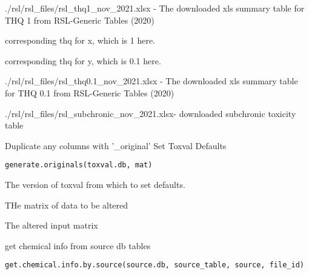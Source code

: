 \documentclass[letterpaper]{book}
\begin{document}
\begin{Arguments}
\begin{ldescription}
\item[\code{x}] ./rsl/rsl\_files/rsl\_thq1\_nov\_2021.xlsx - The downloaded xls summary table for THQ 1 from RSL-Generic Tables (2020)

\item[\code{thq\_x}] corresponding thq for x, which is 1 here.

\item[\code{thq\_y}] corresponding thq for y, which is 0.1 here.

\item[\code{Y}] ./rsl/rsl\_files/rsl\_thq0.1\_nov\_2021.xlsx - The downloaded xls summary table for THQ 0.1 from RSL-Generic Tables (2020)

\item[\code{Z}] ./rsl/rsl\_files/rsl\_subchronic\_nov\_2021.xlsx- downloaded subchronic toxicity table
\end{ldescription}
\end{Arguments}
%
\begin{Description}\relax
Duplicate any columns with '\_original'
Set Toxval Defaults
\end{Description}
%
\begin{Usage}
\begin{verbatim}
generate.originals(toxval.db, mat)
\end{verbatim}
\end{Usage}
%
\begin{Arguments}
\begin{ldescription}
\item[\code{toxval.db}] The version of toxval from which to set defaults.

\item[\code{mat}] THe matrix of data to be altered
\end{ldescription}
\end{Arguments}
%
\begin{Value}
The altered input matrix
\end{Value}
%
\begin{Description}\relax
get chemical info from source db tables
\end{Description}
%
\begin{Usage}
\begin{verbatim}
get.chemical.info.by.source(source.db, source_table, source, file_id)
\end{verbatim}
\end{Usage}
\end{document}
